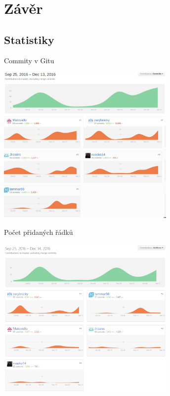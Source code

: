 \documentclass[13pt]{beamer}
\begin{document}

\section{Závěr}
\subsection{Statistiky}
\begin{frame}{Commity v Gitu}
  \begin{center}
    \includegraphics[width=0.65\textwidth]{./img/git_commit.pdf}
  \end{center}
\end{frame}

\begin{frame}{Počet přidaných řádků}
  \begin{center}
    \includegraphics[width=0.65\textwidth]{./img/git_additions.pdf}
  \end{center}
\end{frame}
\end{document}
